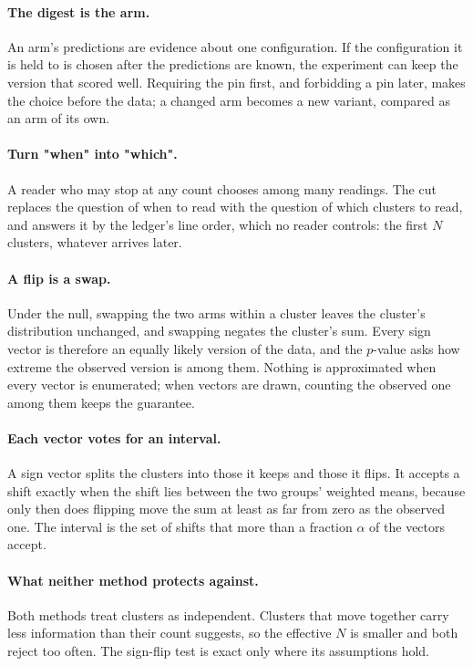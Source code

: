 \documentclass[11pt]{article}
\theoremstyle{plain}
\theoremstyle{definition}
\theoremstyle{remark}
\begin{document}
\paragraph{The digest is the arm.} An arm's predictions are evidence about one configuration. If
the configuration it is held to is chosen after the predictions are known, the experiment can keep
the version that scored well. Requiring the pin first, and forbidding a pin later, makes the
choice before the data; a changed arm becomes a new variant, compared as an arm of its own.

\paragraph{Turn "when" into "which".} A reader who may stop at any count chooses among many
readings. The cut replaces the question of when to read with the question of which clusters to
read, and answers it by the ledger's line order, which no reader controls: the first $N$ clusters,
whatever arrives later.

\paragraph{A flip is a swap.} Under the null, swapping the two arms within a cluster leaves the
cluster's distribution unchanged, and swapping negates the cluster's sum. Every sign vector is
therefore an equally likely version of the data, and the $p$-value asks how extreme the observed
version is among them. Nothing is approximated when every vector is enumerated; when vectors are
drawn, counting the observed one among them keeps the guarantee.

\paragraph{Each vector votes for an interval.} A sign vector splits the clusters into those it
keeps and those it flips. It accepts a shift exactly when the shift lies between the two groups'
weighted means, because only then does flipping move the sum at least as far from zero as the
observed one. The interval is the set of shifts that more than a fraction $\alpha$ of the vectors
accept.

\paragraph{What neither method protects against.} Both methods treat clusters as independent.
Clusters that move together carry less information than their count suggests, so the effective $N$
is smaller and both reject too often. The sign-flip test is exact only where its assumptions hold.
\end{document}
